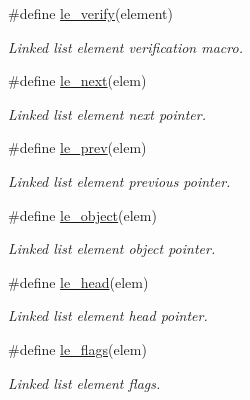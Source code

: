 \begin{CompactItemize}
\#define \hyperlink{group__dbprim__link_a20}{le\_\-verify}(element)
\begin{CompactList}\small\item\em Linked list element verification macro.\item\end{CompactList}\item 
\#define \hyperlink{group__dbprim__link_a21}{le\_\-next}(elem)
\begin{CompactList}\small\item\em Linked list element next pointer.\item\end{CompactList}\item 
\#define \hyperlink{group__dbprim__link_a22}{le\_\-prev}(elem)
\begin{CompactList}\small\item\em Linked list element previous pointer.\item\end{CompactList}\item 
\#define \hyperlink{group__dbprim__link_a23}{le\_\-object}(elem)
\begin{CompactList}\small\item\em Linked list element object pointer.\item\end{CompactList}\item 
\#define \hyperlink{group__dbprim__link_a24}{le\_\-head}(elem)
\begin{CompactList}\small\item\em Linked list element head pointer.\item\end{CompactList}\item 
\#define \hyperlink{group__dbprim__link_a25}{le\_\-flags}(elem)
\begin{CompactList}\small\item\em Linked list element flags.\item\end{CompactList}\end{CompactItemize}
